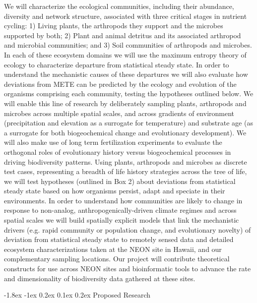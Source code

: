 \documentclass[11pt]{article}
\makeatletter
\renewcommand\section{\@startsection{section}{1}{\z@}%
                                  {-1.8ex \@plus -1ex \@minus 0.2ex}%
                                  {0.1ex \@plus 0.2ex}%
                                  {\normalfont\Large\bfseries}}
\makeatother
\begin{document}
We will characterize the ecological communities, including their
abundance, diversity and network structure, associated with three
critical stages in nutrient cycling: 1) Living plants, the arthropods
they support and the microbes supported by both; 2) Plant and animal
detritus and its associated arthropod and microbial communities; and
3) Soil communities of arthropods and microbes.  In each of these
ecosystem domains we will use the maximum entropy theory of ecology to
characterize departure from statistical steady state.  In order to
understand the mechanistic causes of these departures we will also
evaluate how deviations from METE can be predicted by the ecology and
evolution of the organisms comprising each community, testing the
hypotheses outlined below.  We will enable this line of research by
deliberately sampling plants, arthropods and microbes across multiple
spatial scales, and across gradients of environment (precipitation and
elevation as a surrogate for temperature) and substrate age (as a
surrogate for both biogeochemical change and evolutionary
development).  We will also make use of long term fertilization
experiments \citep[see letter of
collaboration;][]{vitousek1997nutrient} to evaluate the orthogonal
roles of evolutionary history versus biogeochemical processes in
driving biodiversity patterns.  Using plants, arthropods and microbes
as discrete test cases, representing a breadth of life history
strategies across the tree of life, we will test hypotheses (outlined
in Box 2) about deviations from statistical steady state based on how
organisms persist, adapt and speciate in their environments.  In order
to understand how communities are likely to change in response to
non-analog, anthropogenically-driven climate regimes and across
spatial scales we will build spatially explicit models that link the
mechanistic drivers (e.g. rapid community or population change, and
evolutionary novelty) of deviation from statistical steady state to
remotely sensed data and detailed ecosystem characterizations taken at
the NEON site in Hawaii, and our complementary sampling locations. Our
project will contribute theoretical constructs for use across NEON
sites and bioinformatic tools to advance the rate and dimensionality
of biodiversity data gathered at these sites.

\section{Proposed Research}
\end{document}
